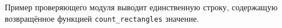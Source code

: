Пример проверяющего модуля выводит единственную строку, содержащую
возвращённое функцией \texttt{count\_rectangles} значение.